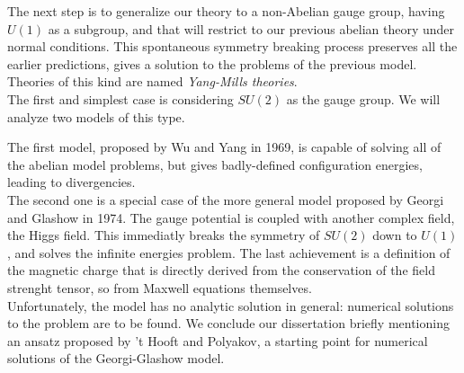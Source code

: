The next step is to generalize our theory to a non-Abelian gauge group, having
$U(1)$ as a subgroup, and that will restrict to our previous abelian theory
under normal conditions.
This spontaneous symmetry breaking process preserves all the earlier predictions,
gives a solution to the problems of the previous model.\\
Theories of this kind are named \emph{Yang-Mills theories}.\\

The first and simplest case is considering $SU(2)$ as the gauge group. We will
analyze two models of this type.

The first model, proposed by Wu and Yang in 1969, is capable of solving all of
the abelian model problems, but gives badly-defined configuration energies, leading
to divergencies.\\
The second one is a special case of the more general model proposed by Georgi and
Glashow in 1974. The gauge potential is coupled with another complex field,
the Higgs field. This immediatly breaks the symmetry of $SU(2)$ down to $U(1)$,
and solves the infinite energies problem. The last achievement is a definition
of the magnetic charge that is directly derived from the conservation of the
field strenght tensor, so from Maxwell equations themselves.\\

Unfortunately, the model has no analytic solution in general: numerical
solutions to the problem are to be found.
We conclude our dissertation briefly mentioning an ansatz proposed
by 't Hooft and Polyakov, a starting point for numerical solutions of the Georgi-Glashow
model.

